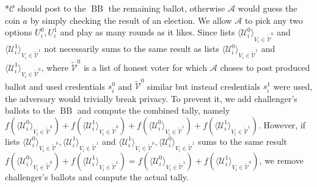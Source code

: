 \documentclass[12pt]{article}
\DeclareMathOperator{\bb}{BB}
\begin{document}
*$\mathcal{C}$ should post to the $\bb$ the remaining ballot, otherwise  $\mathcal{A}$  would guess the coin $a$ by simply checking the result of an election. We allow $\mathcal{A}$ to pick any two options $U_i^0,U_i^1$  and play as many rounds as it likes. Since lists $\langle \mathcal{U}^0_i \rangle _{V_i \in \tilde{\mathcal{V}}^0} $ and  $\langle \mathcal{U}^1_i \rangle _{V_i \in \tilde{\mathcal{V}}^1} $  not necessarily  sums to  the same result as lists  $\langle \mathcal{U}^0_i \rangle _{V_i \in \tilde{\mathcal{V}}^1} $ and  $\langle \mathcal{U}^1_i \rangle _{V_i \in \tilde{\mathcal{V}}^0} $, where $ \tilde{\mathcal{V}}^0$ is a list of honest voter for which $\mathcal{A}$ choses to post produced ballot and used credentials $s_i^0$ and $ \tilde{\mathcal{V}}^0$ similar but instead credentials $s_i^1$ were used, the adversary would trivially break privacy. To prevent it, we add challenger's ballots to the $\bb$ and compute the combined tally, namely $f(\langle \mathcal{U}^0_i \rangle _{V_i \in \tilde{\mathcal{V}}^0} ) + f(\langle \mathcal{U}^1_i \rangle _{V_i \in \tilde{\mathcal{V}}^0} )+ f(\langle \mathcal{U}^0_i \rangle _{V_i \in \tilde{\mathcal{V}}^1} ) +  f(\langle \mathcal{U}^1_i \rangle _{V_i \in \tilde{\mathcal{V}}^1} )$. However, if lists $\langle \mathcal{U}^0_i \rangle _{V_i \in \tilde{\mathcal{V}}^0}, \langle \mathcal{U}^1_i \rangle _{V_i \in \tilde{\mathcal{V}}^1}$ and $\langle \mathcal{U}^1_i \rangle _{V_i \in \tilde{\mathcal{V}}^0}, \langle \mathcal{U}^0_i \rangle _{V_i \in \tilde{\mathcal{V}}^1}$ sums to the same result $f(\langle \mathcal{U}^0_i \rangle _{V_i \in \tilde{\mathcal{V}}^0} ) + f(\langle \mathcal{U}^1_i \rangle _{V_i \in \tilde{\mathcal{V}}^1} ) =  f(\langle \mathcal{U}^0_i \rangle _{V_i \in \tilde{\mathcal{V}}^1} ) +  f(\langle \mathcal{U}^1_i \rangle _{V_i \in \tilde{\mathcal{V}}^0} )$, we remove challenger's ballots and compute the actual tally. \\\\
\end{document}
